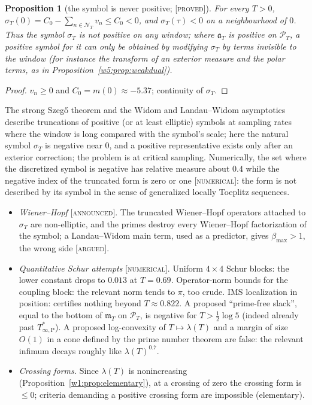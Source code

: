 \documentclass[11pt]{amsart}
\newtheorem{proposition}[theorem]{Proposition}
\theoremstyle{definition}
\theoremstyle{remark}
\numberwithin{equation}{section}
\newcommand{\PT}{\mathcal{P}_T}                        %
\newcommand{\NT}{\mathcal{N}_T}                        %
\newcommand{\mT}{\mathfrak{m}_T}                       %
\newcommand{\aT}{\mathfrak{a}_T}                       %
\newcommand{\sT}{\sigma_T}                             %
\newcommand{\lam}{\lambda(T)}                          %
\newcommand{\Tarch}{T^{*}_{\infty,\mathrm P}}          %
\newcommand{\stag}[1]{\textsc{[#1]}}
\newcommand{\PROVED}{\stag{proved}}
\newcommand{\ARGUED}{\stag{argued}}
\newcommand{\NUM}{\stag{numerical}}
\newcommand{\ANNOUNCED}{\stag{announced}}
\begin{document}
\begin{proposition}[the symbol is never positive; \PROVED]\label{w5:prop:symbolneg}
For every $T>0$, $\sT(0)=C_0-\sum_{n\in\NT}v_n\le C_0<0$, and $\sT(\tau)<0$ on a neighbourhood of $0$. Thus the symbol $\sT$ is not
positive on any window; where $\aT$ is positive on $\PT$, a positive symbol for it can only be obtained by modifying $\sT$
by terms invisible to the window (for instance the transform of an exterior measure and the polar terms, as in Proposition~\ref{w5:prop:weakdual}).
\end{proposition}

\begin{proof}
$v_n\ge0$ and $C_0=m(0)\approx-5.37$; continuity of $\sT$.
\end{proof}

The strong Szeg\H{o} theorem and the Widom and Landau--Widom asymptotics \cite{LandauWidom1980} describe truncations of
positive (or at least elliptic) symbols at sampling rates where the window is long compared with the symbol's scale; here
the natural symbol $\sT$ is negative near $0$, and a positive representative exists only after an exterior
correction; the problem is at critical sampling. Numerically, the set where the discretized
symbol is negative has relative measure about $0.4$ while the negative index of the truncated form is zero or one \NUM:
the form is not described by its symbol in the sense of generalized locally Toeplitz sequences.

\begin{itemize}
\item \emph{Wiener--Hopf} \ANNOUNCED. The truncated Wiener--Hopf operators attached to $\sT$ are non-elliptic, and the
primes destroy every Wiener--Hopf factorization of the symbol; a Landau--Widom main term, used as a predictor, gives
$\beta_{\max}>1$, the wrong side \ARGUED.
\item \emph{Quantitative Schur attempts} \NUM. Uniform $4\times4$ Schur blocks: the lower constant drops to $0.013$ at
$T=0.69$. Operator-norm bounds for the coupling block: the relevant norm tends to $\pi$, too crude. IMS localization in
position: certifies nothing beyond $T\approx0.822$. A proposed ``prime-free slack'', equal to the bottom of $\mT$ on
$\PT$, is negative for $T>\frac12\log5$ (indeed already past $\Tarch$). A proposed log-convexity of $T\mapsto\lam$ and a
margin of size $O(1)$ in a cone defined by the prime number theorem are false: the relevant infimum decays roughly like
$\lam^{0.7}$.
\item \emph{Crossing forms.} Since $\lam$ is nonincreasing (Proposition~\ref{w1:prop:elementary}), at a crossing of zero
the crossing form is $\le0$; criteria demanding a positive crossing form are impossible (elementary).
\end{itemize}
\end{document}
